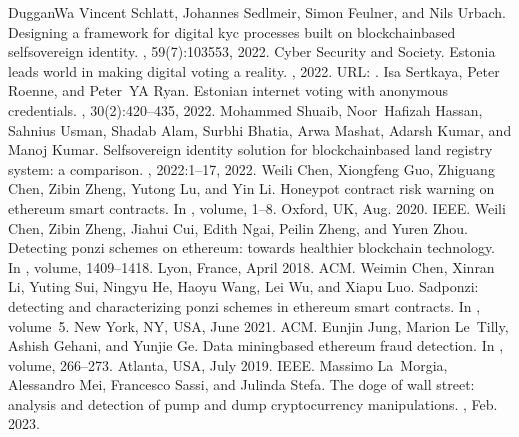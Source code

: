 \documentclass[letterpaper,10pt,english]{jupyterBook}
\begin{document}
\begin{sphinxthebibliography}{DugganWa}
\sphinxAtStartPar
Vincent Schlatt, Johannes Sedlmeir, Simon Feulner, and Nils Urbach. Designing a framework for digital kyc processes built on blockchain\sphinxhyphen{}based self\sphinxhyphen{}sovereign identity. , 59(7):103553, 2022.
\sphinxAtStartPar
Cyber Security and Society. Estonia leads world in making digital voting a reality. , 2022. URL: .
\sphinxAtStartPar
Isa Sertkaya, Peter Roenne, and Peter YA Ryan. Estonian internet voting with anonymous credentials. , 30(2):420–435, 2022.
\sphinxAtStartPar
Mohammed Shuaib, Noor Hafizah Hassan, Sahnius Usman, Shadab Alam, Surbhi Bhatia, Arwa Mashat, Adarsh Kumar, and Manoj Kumar. Self\sphinxhyphen{}sovereign identity solution for blockchain\sphinxhyphen{}based land registry system: a comparison. , 2022:1–17, 2022.
\sphinxAtStartPar
Weili Chen, Xiongfeng Guo, Zhiguang Chen, Zibin Zheng, Yutong Lu, and Yin Li. Honeypot contract risk warning on ethereum smart contracts. In , volume, 1–8. Oxford, UK, Aug. 2020. IEEE.
\sphinxAtStartPar
Weili Chen, Zibin Zheng, Jiahui Cui, Edith Ngai, Peilin Zheng, and Yuren Zhou. Detecting ponzi schemes on ethereum: towards healthier blockchain technology. In , volume, 1409–1418. Lyon, France, April 2018. ACM.
\sphinxAtStartPar
Weimin Chen, Xinran Li, Yuting Sui, Ningyu He, Haoyu Wang, Lei Wu, and Xiapu Luo. Sadponzi: detecting and characterizing ponzi schemes in ethereum smart contracts. In , volume 5. New York, NY, USA, June 2021. ACM.
\sphinxAtStartPar
Eunjin Jung, Marion Le Tilly, Ashish Gehani, and Yunjie Ge. Data mining\sphinxhyphen{}based ethereum fraud detection. In , volume, 266–273. Atlanta, USA, July 2019. IEEE.
\sphinxAtStartPar
Massimo La Morgia, Alessandro Mei, Francesco Sassi, and Julinda Stefa. The doge of wall street: analysis and detection of pump and dump cryptocurrency manipulations. , Feb. 2023.

\end{sphinxthebibliography}
\end{document}
